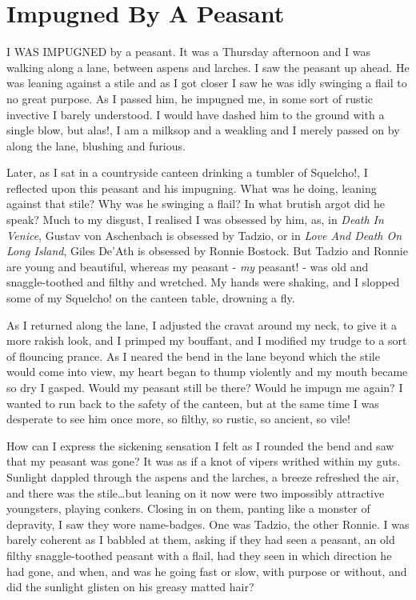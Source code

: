 \chapter{Impugned By A Peasant}

I WAS IMPUGNED by a peasant. It was a Thursday afternoon and I was walking along a lane, between aspens and larches. I saw the peasant up ahead. He was leaning against a stile and as I got closer I saw he was idly swinging a flail to no great purpose. As I passed him, he impugned me, in some sort of rustic invective I barely understood. I would have dashed him to the ground with a single blow, but alas!, I am a milksop and a weakling and I merely passed on by along the lane, blushing and furious.

Later, as I sat in a countryside canteen drinking a tumbler of Squelcho!, I reflected upon this peasant and his impugning. What was he doing, leaning against that stile? Why was he swinging a flail? In what brutish argot did he speak? Much to my disgust, I realised I was obsessed by him, as, in \emph{Death In Venice}, Gustav von Aschenbach is obsessed by Tadzio, or in \emph{Love And Death On Long Island}, Giles De'Ath is obsessed by Ronnie Bostock. But Tadzio and Ronnie are young and beautiful, whereas my peasant - \emph{my} peasant! - was old and snaggle-toothed and filthy and wretched. My hands were shaking, and I slopped some of my Squelcho! on the canteen table, drowning a fly.

As I returned along the lane, I adjusted the cravat around my neck, to give it a more rakish look, and I primped my bouffant, and I modified my trudge to a sort of flouncing prance. As I neared the bend in the lane beyond which the stile would come into view, my heart began to thump violently and my mouth became so dry I gasped. Would my peasant still be there? Would he impugn me again? I wanted to run back to the safety of the canteen, but at the same time I was desperate to see him once more, so filthy, so rustic, so ancient, so vile!

How can I express the sickening sensation I felt as I rounded the bend and saw that my peasant was gone? It was as if a knot of vipers writhed within my guts. Sunlight dappled through the aspens and the larches, a breeze refreshed the air, and there was the stile\ldots  but leaning on it now were two impossibly attractive youngsters, playing conkers. Closing in on them, panting like a monster of depravity, I saw they wore name-badges. One was Tadzio, the other Ronnie. I was barely coherent as I babbled at them, asking if they had seen a peasant, an old filthy snaggle-toothed peasant with a flail, had they seen in which direction he had gone, and when, and was he going fast or slow, with purpose or without, and did the sunlight glisten on his greasy matted hair?

